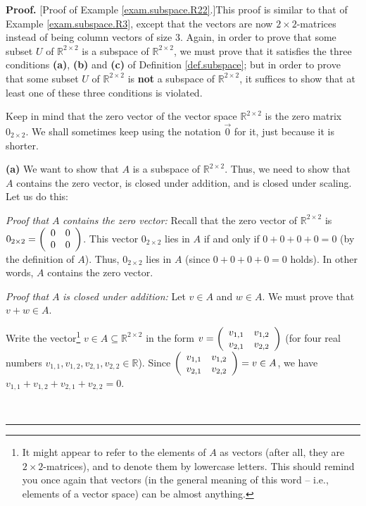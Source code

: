 \documentclass[numbers=enddot,12pt,final,onecolumn,notitlepage]{scrartcl}%
\theoremstyle{definition}
\newenvironment{proof}[1][Proof]{\noindent\textbf{#1.} }{\ \rule{0.5em}{0.5em}}
\begin{document}
\begin{proof}
[Proof of Example \ref{exam.subspace.R22}.]This proof is similar to that of
Example \ref{exam.subspace.R3}, except that the vectors are now $2\times
2$-matrices instead of being column vectors of size $3$. Again, in order to
prove that some subset $U$ of $\mathbb{R}^{2\times2}$ is a subspace of
$\mathbb{R}^{2\times2}$, we must prove that it satisfies the three conditions
\textbf{(a)}, \textbf{(b)} and \textbf{(c)} of Definition \ref{def.subspace};
but in order to prove that some subset $U$ of $\mathbb{R}^{2\times2}$ is
\textbf{not} a subspace of $\mathbb{R}^{2\times2}$, it suffices to show that
at least one of these three conditions is violated.

Keep in mind that the zero vector of the vector space $\mathbb{R}^{2\times2}$
is the zero matrix $0_{2\times2}$. We shall sometimes keep using the notation
$\overrightarrow{0}$ for it, just because it is shorter.

\textbf{(a)} We want to show that $A$ is a subspace of $\mathbb{R}^{2\times2}%
$. Thus, we need to show that $A$ contains the zero vector, is closed under
addition, and is closed under scaling. Let us do this:

\textit{Proof that }$A$\textit{ contains the zero vector:} Recall that the
zero vector of $\mathbb{R}^{2\times2}$ is $0_{2\times2}=\left(
\begin{array}
[c]{cc}%
0 & 0\\
0 & 0
\end{array}
\right)  $. This vector $0_{2\times2}$ lies in $A$ if and only if $0+0+0+0=0$
(by the definition of $A$). Thus, $0_{2\times2}$ lies in $A$ (since
$0+0+0+0=0$ holds). In other words, $A$ contains the zero vector.

\textit{Proof that }$A$ \textit{is closed under addition:} Let $v\in A$ and
$w\in A$. We must prove that $v+w\in A$.

Write the vector\footnote{It might appear to refer to the elements of $A$ as
vectors (after all, they are $2\times2$-matrices), and to denote them by
lowercase letters. This should remind you once again that vectors (in the
general meaning of this word -- i.e., elements of a vector space) can be
almost anything.} $v\in A\subseteq\mathbb{R}^{2\times2}$ in the form
$v=\left(
\begin{array}
[c]{cc}%
v_{1,1} & v_{1,2}\\
v_{2,1} & v_{2,2}%
\end{array}
\right)  $ (for four real numbers $v_{1,1},v_{1,2},v_{2,1},v_{2,2}%
\in\mathbb{R}$). Since $\left(
\begin{array}
[c]{cc}%
v_{1,1} & v_{1,2}\\
v_{2,1} & v_{2,2}%
\end{array}
\right)  =v\in A$, we have $v_{1,1}+v_{1,2}+v_{2,1}+v_{2,2}=0$.


\end{proof}
\end{document}
